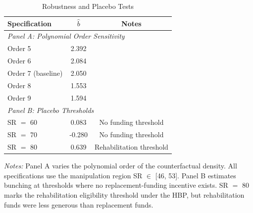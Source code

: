 \begin{table}[htbp]
\centering
\caption{Robustness and Placebo Tests}
\label{tab:robustness}
\begin{tabular}{lcc}
\hline\hline
Specification & $\hat{b}$ & Notes \\
\hline
\multicolumn{3}{l}{\textit{Panel A: Polynomial Order Sensitivity}} \\
Order 5 & 2.392 & \\
Order 6 & 2.084 & \\
Order 7 (baseline) & 2.050 & \\
Order 8 & 1.553 & \\
Order 9 & 1.594 & \\
[6pt]
\multicolumn{3}{l}{\textit{Panel B: Placebo Thresholds}} \\
SR $=$ 60 & 0.083 & No funding threshold \\
SR $=$ 70 & -0.280 & No funding threshold \\
SR $=$ 80 & 0.639 & Rehabilitation threshold \\
\hline\hline
\end{tabular}
\begin{tablenotes}[flushleft]\small
\item \textit{Notes:} Panel A varies the polynomial order of the counterfactual density. All specifications use the manipulation region SR $\in$ [46, 53]. Panel B estimates bunching at thresholds where no replacement-funding incentive exists. SR $=$ 80 marks the rehabilitation eligibility threshold under the HBP, but rehabilitation funds were less generous than replacement funds.
\end{tablenotes}
\end{table}

